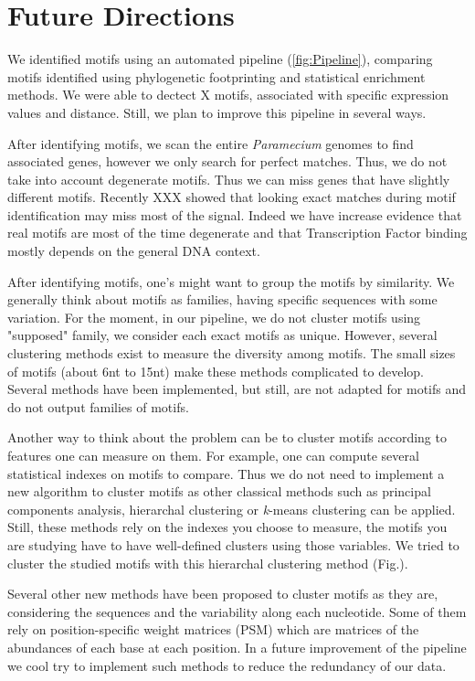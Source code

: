 \section*{Future Directions}
\label{sec:Future}

We identified motifs using an automated pipeline (\autoref{fig:Pipeline}), comparing motifs identified using phylogenetic footprinting and statistical enrichment methods. We were able to dectect X motifs, associated with specific expression values and distance. Still, we plan to improve this pipeline in several ways.

After identifying motifs, we scan the entire \textit{Paramecium} genomes to find associated genes, however we only search for perfect matches. Thus, we do not take into account degenerate motifs. Thus we can miss genes that have slightly different motifs. Recently XXX showed that looking exact matches during motif identification may miss most of the signal. Indeed we have increase evidence that real motifs are most of the time degenerate and that Transcription Factor binding mostly depends on the general DNA context.

After identifying motifs, one's might want to group the motifs by similarity. We generally think about motifs as families, having specific sequences with some variation. For the moment, in our pipeline, we do not cluster motifs using "supposed" family, we consider each exact motifs as unique. However, several clustering methods exist to measure the diversity among motifs. The small sizes of motifs (about 6nt to 15nt) make these methods complicated to develop. Several methods have been implemented, but still, are not adapted for motifs and do not output families of motifs. 

Another way to think about the problem can be to cluster motifs according to features one can measure on them. For example, one can compute several statistical indexes on motifs to compare. Thus we do not need to implement a new algorithm to cluster motifs as other classical methods such as principal components analysis, hierarchal clustering or \textit{k}-means clustering can be applied. Still, these methods rely on the indexes you choose to measure, the motifs you are studying have to have well-defined clusters using those variables. We tried to cluster the studied motifs with this hierarchal clustering method (Fig.).

Several other new methods have been proposed to cluster motifs as they are, considering the sequences and the variability along each nucleotide. Some of them rely on position-specific weight matrices (PSM) which are matrices of the abundances of each base at each position. In a future improvement of the pipeline we cool try to implement such methods to reduce the redundancy of our data.

